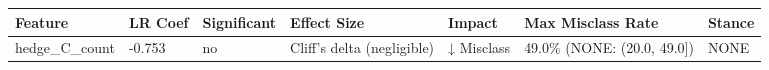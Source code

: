 \begin{tabular}{lllllll}
\toprule
Feature & LR Coef & Significant & Effect Size & Impact & Max Misclass Rate & Stance \\
\midrule
hedge\_C\_count & -0.753 & no & Cliff's delta (negligible) & ↓ Misclass & 49.0\% (NONE: (20.0, 49.0]) & NONE \\
\bottomrule
\end{tabular}

